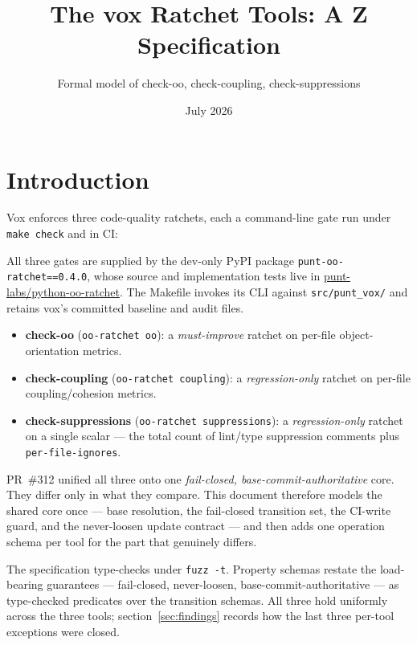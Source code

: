 \documentclass[a4paper,10pt,fleqn]{article}
\begin{document}
\title{The vox Ratchet Tools: A Z Specification}
\author{Formal model of check-oo, check-coupling, check-suppressions}
\date{July 2026}
\maketitle

\tableofcontents
\newpage

\section{Introduction}

Vox enforces three code-quality ratchets, each a command-line gate run
under \texttt{make check} and in CI:

All three gates are supplied by the dev-only PyPI package
\texttt{punt-oo-ratchet==0.4.0}, whose source and implementation tests live in
\href{https://github.com/punt-labs/python-oo-ratchet}{punt-labs/python-oo-ratchet}.
The Makefile invokes its CLI against \texttt{src/punt\_vox/} and retains
vox's committed baseline and audit files.

\begin{itemize}
\item \textbf{check-oo} (\texttt{oo-ratchet oo}): a \emph{must-improve}
  ratchet on per-file object-orientation metrics.
\item \textbf{check-coupling} (\texttt{oo-ratchet coupling}): a
  \emph{regression-only} ratchet on per-file coupling/cohesion metrics.
\item \textbf{check-suppressions} (\texttt{oo-ratchet suppressions}): a
  \emph{regression-only} ratchet on a single scalar --- the total count of
  lint/type suppression comments plus \texttt{per-file-ignores}.
\end{itemize}

PR~\#312 unified all three onto one \emph{fail-closed,
base-commit-authoritative} core. They differ only in what they compare.
This document therefore models the shared core once --- base resolution,
the fail-closed transition set, the CI-write guard, and the never-loosen
update contract --- and then adds one operation schema per tool for the
part that genuinely differs.

The specification type-checks under \texttt{fuzz -t}. Property schemas
restate the load-bearing guarantees --- fail-closed, never-loosen,
base-commit-authoritative --- as type-checked predicates over the
transition schemas. All three hold uniformly across the three tools;
section~\ref{sec:findings} records how the last three per-tool exceptions
were closed.
\end{document}
